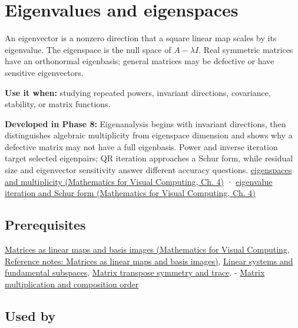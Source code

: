 \hypertarget{appendix-0b3be18411f9}{}\label{referencestart:appendix-0b3be18411f9}
\section{Eigenvalues and eigenspaces}\label{appendix-0b3be18411f9-eigenvalues-and-eigenspaces}

An eigenvector is a nonzero direction that a square linear map scales by its eigenvalue. The eigenspace is the null space of \(A-\lambda I\). Real symmetric matrices have an orthonormal eigenbasis; general matrices may be defective or have sensitive eigenvectors.

\textbf{Use it when:} studying repeated powers, invariant directions, covariance, stability, or matrix functions.

\textbf{Developed in Phase 8:} Eigenanalysis begins with invariant directions, then distinguishes algebraic multiplicity from eigenspace dimension and shows why a defective matrix may not have a full eigenbasis. Power and inverse iteration target selected eigenpairs; QR iteration approaches a Schur form, while residual size and eigenvector sensitivity answer different accuracy questions. \href{../02-Mathematics-for-Visual-Computing/main.pdf\#nameddest=01-foundations-i-ch020-eigenvalues-eigenspaces-and-the-two-kinds-of-multiplicity}{eigenspaces and multiplicity (Mathematics for Visual Computing, Ch. 4)} · \href{../02-Mathematics-for-Visual-Computing/main.pdf\#nameddest=01-foundations-i-ch020-qr-iteration-and-jacobi-rotations-preserve-the-spectrum-while-simplifying-shape}{eigenvalue iteration and Schur form (Mathematics for Visual Computing, Ch. 4)}

\subsection{Prerequisites}\label{appendix-0b3be18411f9-prerequisites}

\href{../02-Mathematics-for-Visual-Computing/main.pdf\#nameddest=appendix-bd39c3bf5d64}{Matrices as linear maps and basis images (Mathematics for Visual Computing, Reference notes: Matrices as linear maps and basis images)}, \hyperref[appendix-8572a4a060c1]{Linear systems and fundamental subspaces}, \hyperref[appendix-175ca5ff874d]{Matrix transpose symmetry and trace}. - \hyperref[appendix-ab31ef447dbf]{Matrix multiplication and composition order}

\subsection{Used by}\label{appendix-0b3be18411f9-used-by}

